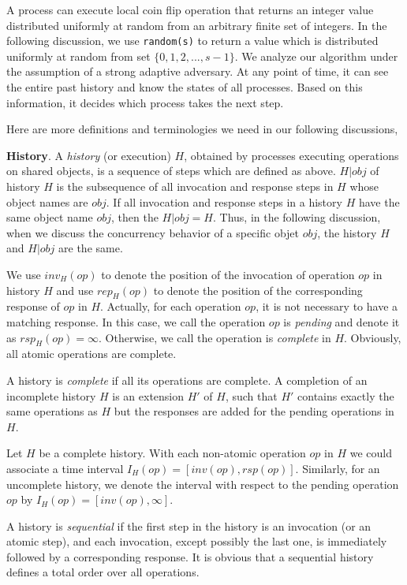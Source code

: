 A process can execute local coin flip operation that returns an integer value distributed uniformly at random from an arbitrary finite set of integers. In the following discussion, we use \texttt{random(s)} to return a value which is distributed uniformly at random from set $\{0, 1, 2,..., s-1\}$. We analyze our algorithm under the assumption of a strong adaptive adversary. At any point of time, it can see the entire past history and know the states of all processes. Based on this information, it decides which process takes the next step.

Here are more definitions and terminologies we need in our following discussions,


\noindent \textbf{History}. A \emph{history} (or execution) $H$, obtained by processes executing operations on shared objects, is a sequence of steps which are defined as above. $H|obj$ of history $H$ is the subsequence of all invocation and response steps in $H$ whose object names are $obj$. If all invocation and response steps in a history $H$ have the same object name $obj$, then the $H|obj = H$. Thus, in the following discussion, when we discuss the concurrency behavior of a specific objet $obj$, the history $H$ and $H|obj$ are the same.

We use $inv_H(op)$ to denote the position of the invocation of operation $op$ in history $H$ and use $rep_H(op)$ to denote the position of the corresponding response of $op$ in $H$. Actually, for each operation $op$, it is not necessary to have a matching response. In this case, we call the operation $op$ is \emph{pending} and denote it as $rsp_H(op) = \infty$. Otherwise, we call the operation is \emph{complete} in $H$. Obviously, all atomic operations are complete.

A history is \emph{complete} if all its operations are complete. A completion of an incomplete history $H$ is an extension $H'$ of $H$, such that $H'$ contains exactly the same operations as $H$ but the responses are added for the pending operations in $H$.

Let $H$ be a complete history. With each non-atomic operation $op$ in $H$ we could associate a time interval $I_H(op) = [inv(op), rsp(op)]$. Similarly, for an uncomplete history, we denote the interval with respect to the pending operation $op$ by $I_H(op) = [inv(op), \infty]$.

A history is \emph{sequential} if the first step in the history is an invocation (or an atomic step), and each invocation, except possibly the last one, is immediately followed by a corresponding response. It is obvious that a sequential history defines a total order over all operations.

